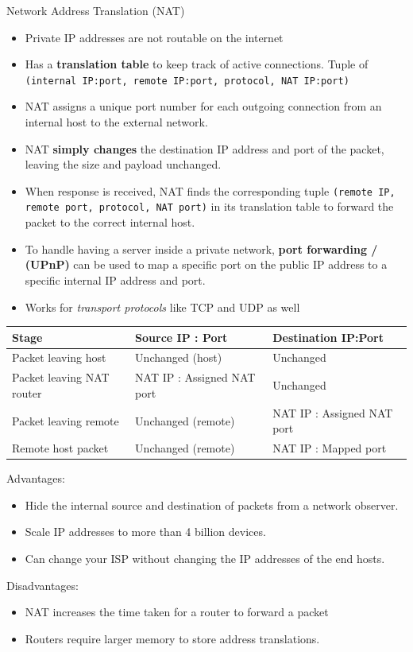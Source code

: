 \begin{definition}
    {Network Address Translation (NAT)}

    \begin{itemize}
        \item Private IP addresses are not routable on the internet
        \item Has a \textbf{translation table} to keep track of active connections. Tuple of \texttt{(internal IP:port, remote IP:port, protocol, NAT IP:port)}
        \item NAT assigns a unique port number for each outgoing connection from an internal host to the external network.
        \item NAT \textbf{simply changes} the destination IP address and port of the packet, leaving the size and payload unchanged.
        \item When response is received, NAT finds the corresponding tuple \texttt{(remote IP, remote port, protocol, NAT port)} in its translation table to forward the packet to the correct internal host.
        \item To handle having a server inside a private network, \textbf{port forwarding / (UPnP)} can be used to map a specific port on the public IP address to a specific internal IP address and port.
        \item Works for \textit{transport protocols} like TCP and UDP as well
    \end{itemize}


    \begin{tabular}{l|l|l}
        \textbf{Stage}            & \textbf{Source IP : Port}  & \textbf{Destination IP:Port} \\ \hline
        Packet leaving host       & Unchanged (host)           & Unchanged                    \\
        Packet leaving NAT router & NAT IP : Assigned NAT port & Unchanged                    \\
        Packet leaving remote     & Unchanged (remote)         & NAT IP : Assigned NAT port   \\
        Remote host packet        & Unchanged (remote)         & NAT IP : Mapped port         \\
    \end{tabular}

\end{definition}
Advantages:
\begin{itemize}
    \item Hide the internal source and destination of packets from a network observer.
    \item Scale IP addresses to more than 4 billion devices.
    \item Can change your ISP without changing the IP addresses of the end hosts.
\end{itemize}

Disadvantages:
\begin{itemize}
    \item NAT increases the time taken for a router to forward a packet
    \item Routers require larger memory to store address translations.
\end{itemize}

